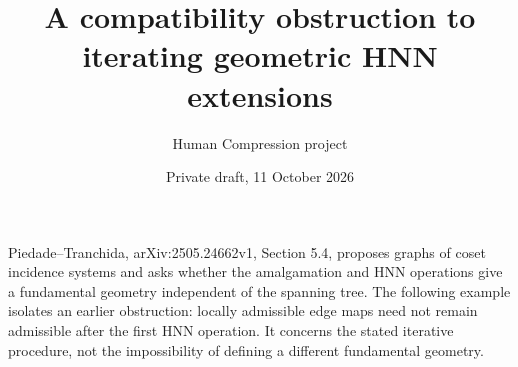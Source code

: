 
\title{A compatibility obstruction to iterating geometric HNN extensions}
\author{Human Compression project}
\date{Private draft, 11 October 2026}

\maketitle

Piedade--Tranchida, arXiv:2505.24662v1, Section 5.4, proposes graphs of
coset incidence systems and asks whether the amalgamation and HNN
operations give a fundamental geometry independent of the spanning tree.
The following example isolates an earlier obstruction: locally admissible
edge maps need not remain admissible after the first HNN operation.
It concerns the stated iterative procedure, not the impossibility of
defining a different fundamental geometry.

